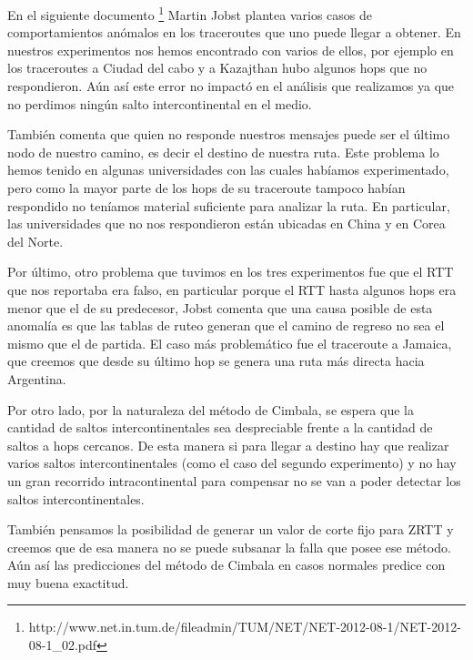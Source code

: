 \par En el siguiente documento \footnote{http://www.net.in.tum.de/fileadmin/TUM/NET/NET-2012-08-1/NET-2012-08-1_02.pdf} Martin Jobst plantea varios casos de comportamientos anómalos en los traceroutes que uno puede llegar a obtener. En nuestros experimentos nos hemos encontrado con varios de ellos, por ejemplo en los traceroutes a Ciudad del cabo y a Kazajthan hubo algunos hops que no respondieron. Aún así este error no impactó en el análisis que realizamos ya que no perdimos ningún salto intercontinental en el medio.
\par También comenta que quien no responde nuestros mensajes puede ser el último nodo de nuestro camino, es decir el destino de nuestra ruta. Este problema lo hemos tenido en algunas universidades con las cuales habíamos experimentado, pero como la mayor parte de los hops de su traceroute tampoco habían respondido no teníamos material suficiente para analizar la ruta. En particular, las universidades que no nos respondieron están ubicadas en China y en Corea del Norte.
\par Por último, otro problema que tuvimos en los tres experimentos fue que el RTT que nos reportaba era falso, en particular porque el RTT hasta algunos hops era menor que el de su predecesor, Jobst comenta que una causa posible de esta anomalía es que las tablas de ruteo generan que el camino de regreso no sea el mismo que el de partida. El caso más problemático fue el traceroute a Jamaica, que creemos que desde su último hop se genera una ruta más directa hacia Argentina. \\
\par Por otro lado, por la naturaleza del método de Cimbala, se espera que la cantidad de saltos intercontinentales sea despreciable frente a la cantidad de saltos a hops cercanos. De esta manera si para llegar a destino hay que realizar varios saltos intercontinentales (como el caso del segundo experimento) y no hay un gran recorrido intracontinental para compensar no se van a poder detectar los saltos intercontinentales.
\par También pensamos la posibilidad de generar un valor de corte fijo para ZRTT y creemos que de esa manera no se puede subsanar la falla que posee ese método. Aún así las predicciones del método de Cimbala en casos normales predice con muy buena exactitud.
